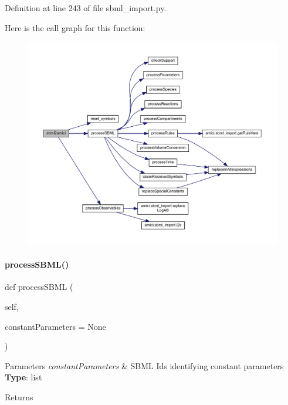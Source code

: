 Definition at line 243 of file sbml\+\_\+import.\+py.

Here is the call graph for this function\+:
\nopagebreak
\begin{figure}[H]
\begin{center}
\leavevmode
\includegraphics[width=350pt]{classamici_1_1sbml__import_1_1_sbml_importer_ab02f5c6e1bc803fe8223280ebb555a82_cgraph}
\end{center}
\end{figure}
\mbox{\label{classamici_1_1sbml__import_1_1_sbml_importer_ac188693ab1d9fc500d55748dbde9bf89}} 
\paragraph{\texorpdfstring{processSBML()}{processSBML()}}
{\footnotesize\ttfamily def process\+S\+B\+ML (\begin{DoxyParamCaption}\item[{}]{self,  }\item[{}]{constant\+Parameters = {\ttfamily None} }\end{DoxyParamCaption})}


\begin{DoxyParams}{Parameters}
{\em constant\+Parameters} & S\+B\+ML Ids identifying constant parameters ~\newline
{\bfseries{Type}}\+: list\\
\hline
\end{DoxyParams}
\begin{DoxyReturn}{Returns}

\end{DoxyReturn}


